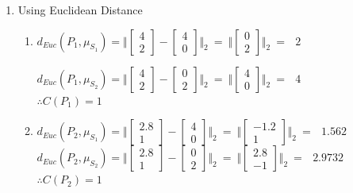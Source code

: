 \documentclass[letterpaper]{article}
\begin{document}
\begin{enumerate}
	\item[(a)] Using Euclidean Distance
\begin{enumerate}
	\item[(i)] $ d_{Euc}(P_1 , \mu_{S_1}) = \Vert \begin{bmatrix} 4 \\ 2\end{bmatrix} - \begin{bmatrix} 4 \\ 0\end{bmatrix} \Vert_2 ~=~ \Vert \begin{bmatrix} 0 \\ 2\end{bmatrix} \Vert_2 ~=~~~ 2$	\\ \vskip 1mm

	$ d_{Euc}(P_1 , \mu_{S_2}) = \Vert \begin{bmatrix} 4 \\ 2\end{bmatrix} - \begin{bmatrix} 0 \\ 2\end{bmatrix} \Vert_2 ~=~ \Vert \begin{bmatrix} 4 \\ 0\end{bmatrix} \Vert_2 ~=~~~ 4$ \\ \vskip 1mm
	$\therefore C(P_1) = 1$
	
	\item[(ii)] $ d_{Euc}(P_2 , \mu_{S_1}) = \Vert \begin{bmatrix} 2.8 \\ 1\end{bmatrix} - \begin{bmatrix} 4 \\ 0\end{bmatrix} \Vert_2 ~=~ \Vert \begin{bmatrix} -1.2 \\ 1\end{bmatrix} \Vert_2 ~=~~~ 1.562$	\\ \vskip 1mm
	$ d_{Euc}(P_2 , \mu_{S_2}) = \Vert \begin{bmatrix} 2.8 \\ 1\end{bmatrix} - \begin{bmatrix} 0 \\ 2\end{bmatrix} \Vert_2 ~=~ \Vert \begin{bmatrix} 2.8 \\ -1\end{bmatrix} \Vert_2 ~=~~~ 2.9732$ \\ \vskip 1mm
	$\therefore C(P_2) = 1$


\end{enumerate}
\end{enumerate}
\end{document}
